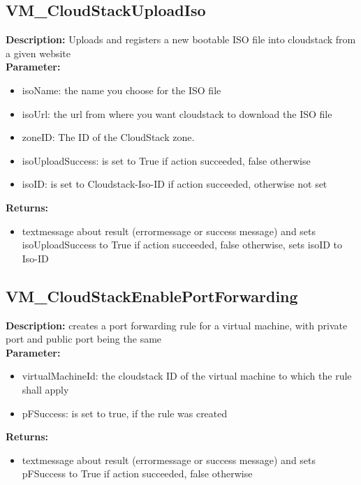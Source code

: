 \subsection{VM\_CloudStackUploadIso}
\textbf{Description:} Uploads and registers a new bootable ISO file into cloudstack from a given website\\
\textbf{Parameter:}
\begin{itemize}
\item isoName: the name you choose for the ISO file 
\item isoUrl: the url from where you want cloudstack to download the ISO file
\item zoneID: The ID of the CloudStack zone.
\item isoUploadSuccess: is set to True if action succeeded, false otherwise
\item isoID: is set to Cloudstack-Iso-ID if action succeeded, otherwise not set
\end{itemize}
\textbf{Returns:}
\begin{itemize}
\item textmessage about result (errormessage or success message) and sets isoUploadSuccess to True if action succeeded, false otherwise, sets isoID to Iso-ID
\end{itemize}

\subsection{VM\_CloudStackEnablePortForwarding}
\textbf{Description:} creates a port forwarding rule for a virtual machine, with private port and public port being the same\\
\textbf{Parameter:}
\begin{itemize}
\item virtualMachineId: the cloudstack ID of the virtual machine to which the rule shall apply
\item pFSuccess: is set to true, if the rule was created
\end{itemize}
\textbf{Returns:}
\begin{itemize}
\item textmessage about result (errormessage or success message) and sets pFSuccess to True if action succeeded, false otherwise
\end{itemize}

